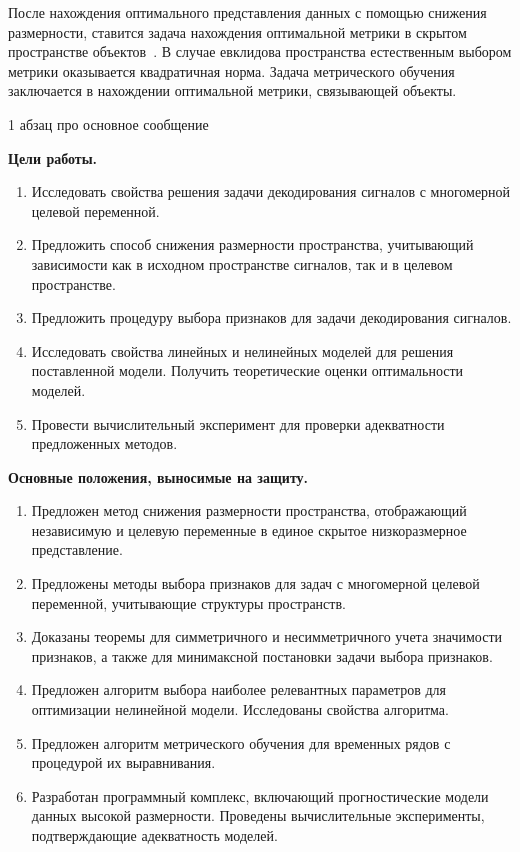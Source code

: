 После нахождения оптимального представления данных с помощью снижения размерности, ставится задача нахождения оптимальной метрики в скрытом пространстве объектов~\cite{davis2007information,kulis2012metric,yang2006distance,weinberger2009distance}.
В случае евклидова пространства естественным выбором метрики оказывается квадратичная норма.
Задача метрического обучения заключается в нахождении оптимальной метрики, связывающей объекты.

{\color{red} 1 абзац про основное сообщение}

\vspace{0.5cm}
\textbf{Цели работы.}
\begin{enumerate}
	\item Исследовать свойства решения задачи декодирования сигналов с многомерной целевой переменной.
	\item Предложить способ снижения размерности пространства, учитывающий зависимости как в исходном пространстве сигналов, так и в целевом пространстве.
	\item Предложить процедуру выбора признаков для задачи декодирования сигналов.
	\item Исследовать свойства линейных и нелинейных моделей для решения поставленной модели. Получить теоретические оценки оптимальности моделей.
	\item Провести вычислительный эксперимент для проверки адекватности предложенных методов.
\end{enumerate}


\vspace{0.5cm}
\textbf{Основные положения, выносимые на защиту.}
\begin{enumerate}
	\item Предложен метод снижения размерности пространства, отображающий независимую и целевую переменные в единое скрытое низкоразмерное представление.
	\item Предложены методы выбора признаков для задач с многомерной целевой переменной, учитывающие структуры пространств.
	\item Доказаны теоремы для симметричного и несимметричного учета значимости признаков, а также для минимаксной постановки задачи выбора признаков.
	\item Предложен алгоритм выбора наиболее релевантных параметров для оптимизации нелинейной модели. Исследованы свойства алгоритма.
	\item Предложен алгоритм метрического обучения для временных рядов с процедурой их выравнивания.
	\item Разработан программный комплекс, включающий прогностические модели данных высокой размерности. Проведены вычислительные эксперименты, подтверждающие адекватность моделей.
\end{enumerate}


